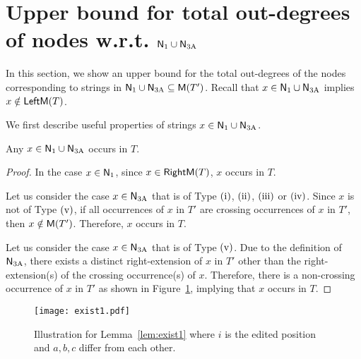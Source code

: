 \section{Upper bound for total out-degrees of nodes w.r.t. $\mathsf{N}_{\mathrm{1}} \cup \mathsf{N}_{\mathrm{3A}}$}
\label{sec:upper_bound_1}

  In this section, we show an upper bound for the total out-degrees of the nodes corresponding to strings in $\mathsf{N}_{\mathrm{1}} \cup \mathsf{N}_{\mathrm{3A}}  \subseteq \mathsf{M}(T')$.
  Recall that $x \in \mathsf{N}_{\mathrm{1}} \cup \mathsf{N}_{\mathrm{3A}}$ implies $x \notin \mathsf{LeftM}(T)$.
  
We first describe useful properties of
strings $x \in \mathsf{N}_{\mathrm{1}} \cup \mathsf{N}_{\mathrm{3A}}$.
  
  \begin{lemma} \label{lem:exist1}
    Any $x \in \mathsf{N}_{\mathrm{1}} \cup \mathsf{N}_{\mathrm{3A}}$ occurs in $T$.
  \end{lemma}

  \begin{proof}
    In the case $x \in \mathsf{N}_{\mathrm{1}}$, since $x \in \mathsf{RightM}(T)$, 
    $x$ occurs in $T$. 

    Let us consider the case $x \in \mathsf{N}_{\mathrm{3A}}$ that is of Type $\rm{(i)}$, $\rm{(ii)}$, $\rm{(iii)}$ or $\rm{(iv)}$.
    Since $x$ is not of Type $\rm{(v)}$, 
    if all occurrences of $x$ in $T'$ are crossing occurrences of $x$ in $T'$, then $x \notin \mathsf{M}(T')$.
    Therefore, $x$ occurs in $T$.

    Let us consider the case $x \in \mathsf{N}_{\mathrm{3A}}$ that is of Type $\rm{(v)}$.
    Due to the definition of $\mathsf{N}_{\mathrm{3A}}$, there exists a distinct right-extension of $x$ in $T'$ other than the right-extension(s) of the crossing occurrence(s) of $x$.
    Therefore, there is a non-crossing occurrence of $x$ in $T'$
    as shown in Figure~\ref{fig:exsit1},
    implying that $x$ occurs in $T$.
  \end{proof}

  \begin{figure}[hbt]
    \centering
    \texttt{[image: exist1.pdf]}
    \caption{Illustration for Lemma~\ref{lem:exist1} where $i$ is the edited position and $a, b, c$ differ from each other.}
    \label{fig:exsit1}
  \end{figure}


